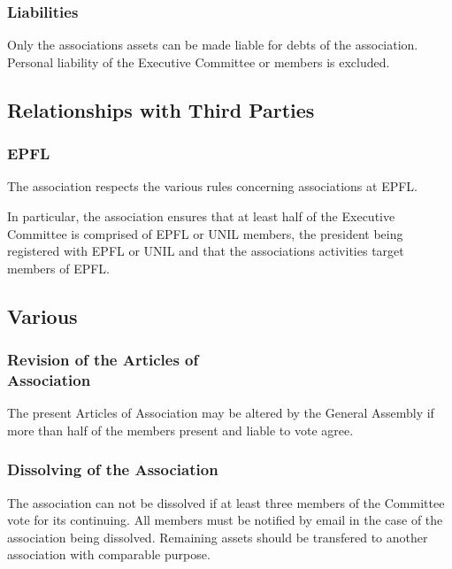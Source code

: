 \documentclass[12pt,a4paper,oneside]{article}
\newcounter{art}
\newcommand{\english}{    \switchcolumn[0]\noindent}
\begin{document}
\begin{paracol}{2}
\english
	\subsubsection{Liabilities}
	Only the associations assets can be made liable for debts of the association. Personal liability of the Executive Committee or members is excluded.
		\vspace{1.5cm}



\english
	\subsection{Relationships with Third Parties}

	\subsubsection{EPFL}
	The association respects the various rules concerning associations at EPFL.

	In particular, the association ensures that at least half of the Executive Committee is comprised of EPFL or UNIL members, the president being registered with EPFL or UNIL and that the associations activities target members of EPFL. 
			\vspace{2.5cm}




\english
	\subsection{Various}



\english
	\subsubsection{Revision of the Articles of \\ Association}
	The present Articles of Association may be altered by the General Assembly if more than half of the members present and liable to vote agree. 		
	\vspace{0.5cm}


\english
	\subsubsection{Dissolving of the Association}
	The association can not be dissolved if at least three members of the Committee vote for its continuing.
	All members must be notified by email in the case of the association being dissolved.
	Remaining assets should be transfered to another association with comparable purpose.



\end{paracol}
\end{document}
